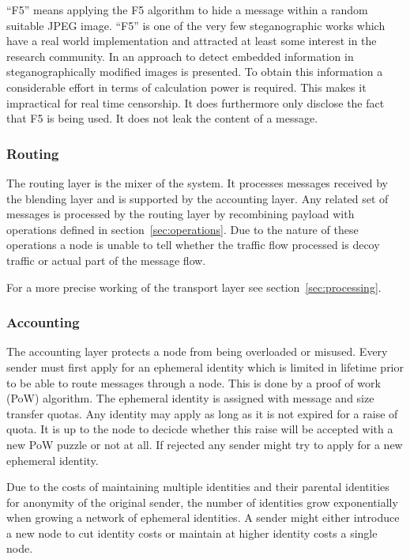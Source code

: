 \documentclass[9pt,journal,compsoc]{IEEEtran}
\begin{document}
``F5'' means applying the F5 algorithm to hide a message within a random suitable JPEG image. ``F5'' is one of the very few steganographic works which have a real world implementation and attracted at least some interest in the research community. In \cite{steganalysisf5} an approach to detect embedded information in steganographically modified images is presented. To obtain this information a considerable effort in terms of calculation power is required. This makes it impractical for real time censorship. It does furthermore only disclose the fact that F5 is being used. It does not leak the content of a message.

\subsubsection{Routing}
The routing layer is the mixer of the system. It processes messages received by the blending layer and is supported by the accounting layer. Any related set of messages is processed by the routing layer by recombining payload with operations defined in section~\ref{sec:operations}. Due to the nature of these operations a node is unable to tell whether the traffic flow processed is decoy traffic or actual part of the message flow.

For a more precise working of the transport layer see section~\ref{sec:processing}.

\subsubsection{Accounting}
The accounting layer protects a node from being overloaded or misused. Every sender must first apply for an ephemeral identity which is limited in lifetime prior to be able to route messages through a node. This is done by a proof of work (PoW) algorithm. The ephemeral identity is assigned with message and size transfer quotas. Any identity may apply as long as it is not expired for a raise of quota. It is up to the node to decicde whether this raise will be accepted with a new PoW puzzle or not at all. If rejected any sender might try to apply for a new ephemeral identity.

Due to the costs of maintaining multiple identities and their parental identities for anonymity of the original sender, the number of identities grow exponentially when growing a network of ephemeral identities. A sender might either introduce a new node to cut identity costs or maintain at higher identity costs a single node.
\end{document}
